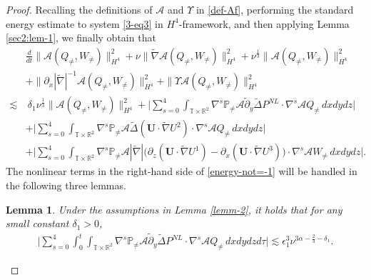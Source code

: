 \documentclass[11pt,reqno]{article}
\newtheorem{lemm}[theo]{Lemma}
\numberwithin{equation}{section}
\newcommand\R{{\mathbb R}}
\newcommand\T{{\mathbb T}}
\newcommand\PP{{\mathbb P}}
\newcommand\F{{\mathcal F}}
\newcommand\A{\mathcal{A}}
\newcommand\U{\bm{U}}
\newcommand \tri {\coloneqq}
\let\pa=\partial
\let\al=\alpha
\let\f=\frac
\let\ep=\epsilon
\begin{document}
\begin{proof}
Recalling the definitions of $\A$ and $\varUpsilon$ in \eqref{def-Af}, performing the standard energy estimate to system \eqref{3-eq3} in $H^4$-framework, and then applying Lemma \ref{sec2:lem-1}, we finally obtain that
\begin{align}	
	\label{energy-not=-1}
	&\f{d}{dt}\|\A(Q_{\not=},W_{\not=})\|_{H^4}^2
	+\nu \|\widetilde{\nabla}\A(Q_{\not=},W_{\not=})\|_{H^4}^2
	+\nu^{\f13} \|\A(Q_{\not=},W_{\not=})\|_{H^4}^2
	\nonumber
	\\
	&+\|\pa_{x}|\widetilde{\nabla}|^{-1}\A(Q_{\not=},W_{\not=})\|_{H^4}^2
	+\|\varUpsilon \A( Q_{\not=}, W_{\not=})\|_{H^4}^2
	\nonumber
	\\
	\lesssim&~
    \delta_1\nu^{\f13}\|\A(Q_{\not=},W_{\not=})\|_{H^4}^2+
	\Big|\sum_{s=0}^{4}
	\int_{\T\times\R^2} \nabla^s\PP_{\not=}\A \tilde{\pa}_y\widetilde{\Delta} P^{NL}
	\cdot
	\nabla^s\A Q_{\not=} \,dxdydz\Big|
	\nonumber
	\\
	&
	+
	\Big|\sum_{s=0}^{4}
	\int_{\T\times\R^2} \nabla^s\PP_{\not=}\A\widetilde{\Delta}(\U\cdot\widetilde{\nabla}U^2)
	\cdot
	\nabla^s\A Q_{\not=}
	\,dxdydz\Big|
	\nonumber
	\\
	&
	+\Big|\sum_{s=0}^{4}
	\int_{\T\times\R^2}
	\nabla^s\PP_{\not=}\A|\widetilde{\nabla}|\big(
	\pa_{z}(\U\cdot\widetilde{\nabla}U^1)-\pa_{x}(\U\cdot\widetilde{\nabla}U^3)
	\big)
	\cdot
	\nabla^s\A W_{\not=}
	\,dxdydz\Big|.
\end{align}
The nonlinear terms in the right-hand side of \eqref{energy-not=-1} will be
handled in the following three lemmas.
\begin{lemm}\label{lemm-2-1}
	Under the assumptions in Lemma \ref{lemm-2}, it holds that for any small constant $\delta_1>0$,
	\begin{align}\label{4est-1}
		\Big|\sum_{s=0}^{4}
		\int_0^t\int_{\T\times\R^2}\nabla^s\PP_{\not=}\A \tilde{\pa}_y\widetilde{\Delta} P^{NL}
		\cdot
		\nabla^s\A Q_{\not=} \,dxdydzd\tau \big|
		\lesssim \ep_1^3\nu^{3\al-\f23-\delta_1}.

\end{align}
\end{lemm}
\end{proof}
\end{document}

